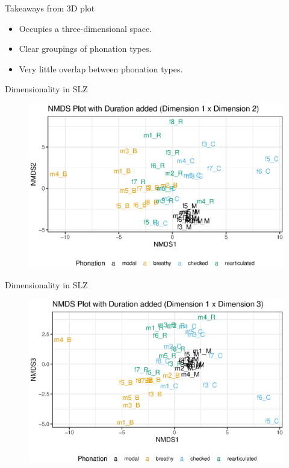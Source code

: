 \documentclass[professionalfonts]{beamer}
\begin{document}
\begin{frame}{Takeaways from 3D plot}
  \begin{itemize}
    \item Occupies a three-dimensional space.
    \item Clear groupings of phonation types.
    \item Very little overlap between phonation types.
  \end{itemize}
\end{frame}

\begin{frame}{Dimensionality in SLZ}
  \begin{figure}
    \centering
    \includegraphics[width = 0.8\linewidth]{images/MDS/nmds12_dur.eps}
  \end{figure}
\end{frame}

\begin{frame}{Dimensionality in SLZ}
  \begin{figure}
    \centering
    \includegraphics[width = 0.8\linewidth]{images/MDS/nmds13_dur.eps}
  \end{figure}
\end{frame}
\end{document}
